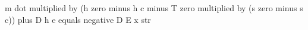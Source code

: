 m dot multiplied by (h zero minus h c minus T zero multiplied by (s zero minus s c)) plus D h e equals negative D E x str
